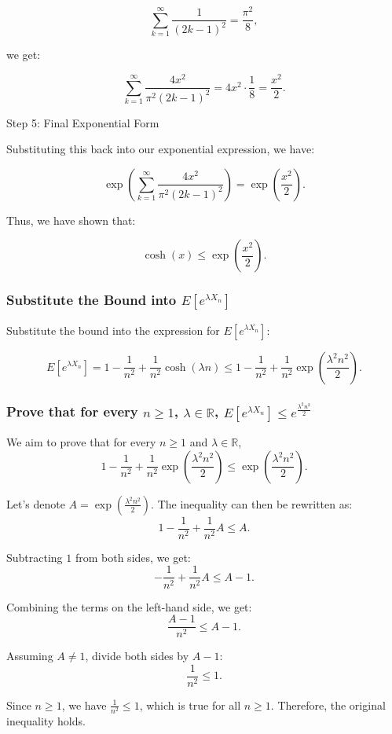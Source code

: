\documentclass[a4 paper]{article}
\theoremstyle{boldStyle}
\theoremstyle{boldBlueStyle}
\theoremstyle{boldPurpleStyle}
\theoremstyle{boldRedStyle}
\begin{document}
\begin{enumerate}
\[
\sum_{k=1}^{\infty} \frac{1}{(2k - 1)^2} = \frac{\pi^2}{8},
\]

we get:

\[
\sum_{k=1}^{\infty} \frac{4x^2}{\pi^2 (2k - 1)^2} = 4x^2 \cdot \frac{1}{8} = \frac{x^2}{2}.
\]

Step 5: Final Exponential Form

Substituting this back into our exponential expression, we have:

\[
\exp\left( \sum_{k=1}^{\infty} \frac{4x^2}{\pi^2 (2k - 1)^2} \right) = \exp\left( \frac{x^2}{2} \right).
\]

Thus, we have shown that:

\[
\cosh(x) \leq \exp\left( \frac{x^2}{2} \right).
\]

\subsubsection*{Substitute the Bound into $E[e^{\lambda X_n}]$}

Substitute the bound into the expression for $E[e^{\lambda X_n}]$:

\[
E[e^{\lambda X_n}] = 1 - \frac{1}{n^2} + \frac{1}{n^2} \cosh(\lambda n) \leq 1 - \frac{1}{n^2} + \frac{1}{n^2} \exp\left( \frac{\lambda^2 n^2}{2} \right).
\]

\subsubsection*{Prove that for every $n \geq 1$, $\lambda \in \mathbb{R}$,  $E[e^{\lambda X_n}] \leq e^{\frac{\lambda^2 n^2}{2}}$}

We aim to prove that for every $n \geq 1$ and $\lambda \in \mathbb{R}$,
\[
1 - \frac{1}{n^2} + \frac{1}{n^2} \exp\left( \frac{\lambda^2 n^2}{2} \right) \leq \exp\left( \frac{\lambda^2 n^2}{2} \right).
\]

Let's denote $A = \exp\left( \frac{\lambda^2 n^2}{2} \right)$. The inequality can then be rewritten as:
\[
1 - \frac{1}{n^2} + \frac{1}{n^2} A \leq A.
\]

Subtracting $1$ from both sides, we get:
\[
-\frac{1}{n^2} + \frac{1}{n^2} A \leq A - 1.
\]

Combining the terms on the left-hand side, we get:
\[
\frac{A - 1}{n^2} \leq A - 1.
\]

Assuming $A \neq 1$, divide both sides by $A - 1$:
\[
\frac{1}{n^2} \leq 1.
\]

Since $n \geq 1$, we have $\frac{1}{n^2} \leq 1$, which is true for all $n \geq 1$. Therefore, the original inequality holds.


\end{enumerate}
\end{document}
